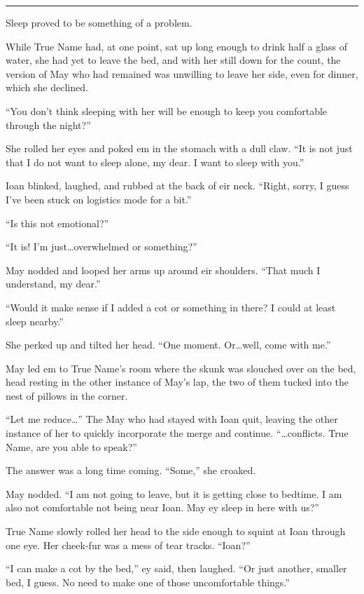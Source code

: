 \begin{center}\rule{0.5\linewidth}{0.5pt}\end{center}

Sleep proved to be something of a problem.

While True Name had, at one point, sat up long enough to drink half a glass of water, she had yet to leave the bed, and with her still down for the count, the version of May who had remained was unwilling to leave her side, even for dinner, which she declined.

``You don't think sleeping with her will be enough to keep you comfortable through the night?''

She rolled her eyes and poked em in the stomach with a dull claw. ``It is not just that I do not want to sleep alone, my dear. I want to sleep with you.''

Ioan blinked, laughed, and rubbed at the back of eir neck. ``Right, sorry, I guess I've been stuck on logistics mode for a bit.''

``Is this not emotional?''

``It is! I'm just\ldots overwhelmed or something?''

May nodded and looped her arms up around eir shoulders. ``That much I understand, my dear.''

``Would it make sense if I added a cot or something in there? I could at least sleep nearby.''

She perked up and tilted her head. ``One moment. Or\ldots well, come with me.''

May led em to True Name's room where the skunk was slouched over on the bed, head resting in the other instance of May's lap, the two of them tucked into the nest of pillows in the corner.

``Let me reduce\ldots{}'' The May who had stayed with Ioan quit, leaving the other instance of her to quickly incorporate the merge and continue. ``\ldots conflicts. True Name, are you able to speak?''

The answer was a long time coming. ``Some,'' she croaked.

May nodded. ``I am not going to leave, but it is getting close to bedtime. I am also not comfortable not being near Ioan. May ey sleep in here with us?''

True Name slowly rolled her head to the side enough to squint at Ioan through one eye. Her cheek-fur was a mess of tear tracks. ``Ioan?''

``I can make a cot by the bed,'' ey said, then laughed. ``Or just another, smaller bed, I guess. No need to make one of those uncomfortable things.''

